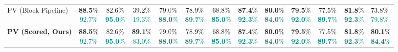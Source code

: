 \begin{table}[t]
{\begin{tabular}{@{}lcccccccccc@{}}
    PV (Block Pipeline) & \shortstack{\textbf{88.5}\% \\ \textcolor{teal}{\scriptsize 92.7\%}} & \shortstack{82.6\% \\ \textcolor{teal}{\scriptsize \textbf{95.0}\%}} & \shortstack{39.2\% \\ \textcolor{teal}{\scriptsize 19.3\%}} & \shortstack{79.0\% \\ \textcolor{teal}{\scriptsize \textbf{88.0}\%}} & \shortstack{78.9\% \\ \textcolor{teal}{\scriptsize \textbf{89.7}\%}} & \shortstack{68.8\% \\ \textcolor{teal}{\scriptsize \textbf{85.0}\%}} & \shortstack{\textbf{87.4}\% \\ \textcolor{teal}{\scriptsize \textbf{92.3}\%}} & \shortstack{\textbf{80.0}\% \\ \textcolor{teal}{\scriptsize \textbf{84.0}\%}} & \shortstack{\textbf{79.5}\% \\ \textcolor{teal}{\scriptsize \textbf{92.0}\%}} & \shortstack{77.5\% \\ \textcolor{teal}{\scriptsize \textbf{89.7}\%}} & \shortstack{\textbf{81.8}\% \\ \textcolor{teal}{\scriptsize \textbf{92.3}\%}} & \shortstack{73.8\% \\ \textcolor{teal}{\scriptsize 79.8\%}} \\
    \textbf{PV (Scored, Ours)} & \shortstack{\textbf{88.5}\% \\ \textcolor{teal}{\scriptsize 92.7\%}} & \shortstack{82.6\% \\ \textcolor{teal}{\scriptsize \textbf{95.0}\%}} & \shortstack{\textbf{89.1}\% \\ \textcolor{teal}{\scriptsize 83.0\%}} & \shortstack{79.0\% \\ \textcolor{teal}{\scriptsize \textbf{88.0}\%}} & \shortstack{78.9\% \\ \textcolor{teal}{\scriptsize \textbf{89.7}\%}} & \shortstack{68.8\% \\ \textcolor{teal}{\scriptsize \textbf{85.0}\%}} & \shortstack{\textbf{87.4}\% \\ \textcolor{teal}{\scriptsize \textbf{92.3}\%}} & \shortstack{\textbf{80.0}\% \\ \textcolor{teal}{\scriptsize \textbf{84.0}\%}} & \shortstack{\textbf{79.5}\% \\ \textcolor{teal}{\scriptsize \textbf{92.0}\%}} & \shortstack{77.5\% \\ \textcolor{teal}{\scriptsize \textbf{89.7}\%}} & \shortstack{\textbf{81.8}\% \\ \textcolor{teal}{\scriptsize \textbf{92.3}\%}} & \shortstack{\textbf{80.1}\% \\ \textcolor{teal}{\scriptsize \textbf{84.4}\%}} \\

\end{tabular}}
\end{table}
